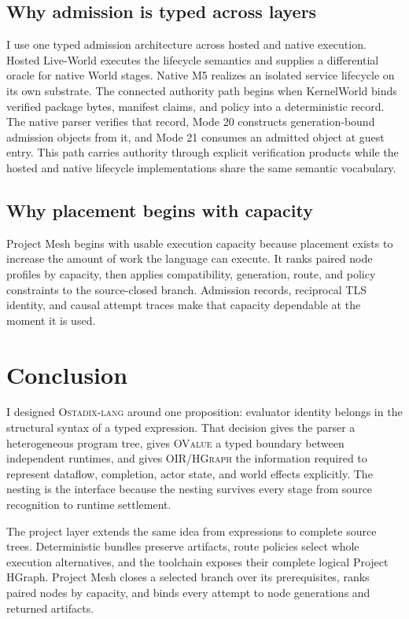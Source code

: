 \documentclass[11pt,oneside]{article}
\newcommand{\product}{\textsc{Ostadix-lang}}
\newcommand{\ovalue}{\textsc{OValue}}
\newcommand{\oir}{\textsc{OIR}}
\newcommand{\hgraph}{\textsc{HGraph}}
\begin{document}
\subsection{Why admission is typed across layers}

I use one typed admission architecture across hosted and native execution.
Hosted Live-World executes the lifecycle semantics and supplies a differential
oracle for native World stages. Native M5 realizes an isolated service
lifecycle on its own substrate. The connected authority path begins when
KernelWorld binds verified package bytes, manifest claims, and policy into a
deterministic record. The native parser verifies that record, Mode 20
constructs generation-bound admission objects from it, and Mode 21 consumes an
admitted object at guest entry. This path carries authority through explicit
verification products while the hosted and native lifecycle implementations
share the same semantic vocabulary.

\subsection{Why placement begins with capacity}

Project Mesh begins with usable execution capacity because placement exists to
increase the amount of work the language can execute. It ranks paired node
profiles by capacity, then applies compatibility, generation, route, and
policy constraints to the source-closed branch. Admission records, reciprocal
TLS identity, and causal attempt traces make that capacity dependable at the
moment it is used.

\section{Conclusion}

I designed \product{} around one proposition: evaluator identity belongs in
the structural syntax of a typed expression. That decision gives the parser a
heterogeneous program tree, gives \ovalue{}
a typed boundary between independent runtimes, and gives \oir{}/\hgraph{} the
information required to represent dataflow, completion, actor state, and
world effects explicitly. The nesting is the interface because the nesting
survives every stage from source recognition to runtime settlement.

The project layer extends the same idea from expressions to complete source
trees. Deterministic bundles preserve artifacts, route policies select whole
execution alternatives, and the toolchain exposes their complete logical
Project HGraph. Project Mesh closes a selected branch over its prerequisites,
ranks paired nodes by capacity, and binds every attempt to node generations
and returned artifacts.
\end{document}
